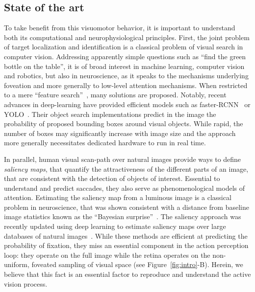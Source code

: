 %
\subsection*{State of the art}

To take benefit from this visuomotor behavior, it is important to understand both its computational and neurophysiological principles. First, the joint problem of target localization and identification is a classical problem of visual search in computer vision. Addressing apparently simple questions such as ``find the green bottle on the table'', it is of broad interest in machine learning, computer vision and robotics, but also in neuroscience, as it speaks to the mechanisms underlying foveation and more generally to low-level attention mechanisms.
When restricted to a mere ``feature search''~\cite{Treisman80}, many solutions are proposed. Notably, recent advances in deep-learning have provided efficient models such as faster-RCNN~\cite{Ren17} or YOLO~\cite{Redmon15}. 
Their object search implementations predict in the image the probability of proposed bounding boxes around visual objects. While rapid, the number of boxes may significantly increase with image size and the approach more generally necessitates dedicated hardware to run in real time. 

In parallel, human visual scan-path over natural images provide ways to define \emph{saliency maps}, that quantify the attractiveness of the different parts of an image, that are consistent with the detection of objects of interest. Essential to understand and predict saccades, they also serve as phenomenological models of attention. Estimating the saliency map from  a luminous image is a classical problem in neuroscience, that was shown consistent with a distance from baseline image statistics known as the ``Bayesian surprise''~\cite{Itti01}. The saliency approach was recently updated using deep learning to estimate saliency maps over large databases of natural images~\cite{Kummerer16}. 
While these methods are efficient at predicting the probability of fixation, they miss an essential component in the action perception loop: they operate on the full image while the retina operates on the non-uniform, foveated sampling of visual space (see Figure~\ref{fig:intro}-B). 
Herein, we believe that this fact is an essential factor to reproduce and understand the active vision process.

